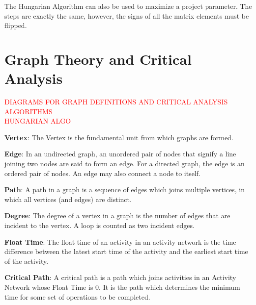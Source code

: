 \begin{note}
	The Hungarian Algorithm can also be used to maximize a project parameter. The steps are exactly the same, however, the signs of all the matrix elements must be flipped.	
\end{note}



\section{Graph Theory and Critical Analysis} \label{Module1:GraphTheoryCriticalAnalysis}

\textcolor{red} {DIAGRAMS FOR GRAPH DEFINITIONS  AND CRITICAL ANALYSIS ALGORITHMS}\\
\textcolor{red}{HUNGARIAN ALGO}
\begin{defn}\label{mod1:defn:Vertex}
   \textbf{Vertex}: The Vertex is the fundamental unit from which graphs are formed.
\end{defn}

\begin{defn}\label{mod1:defn:Edge}
   \textbf{Edge}: In an undirected graph, an unordered pair of nodes that signify  a line joining  two nodes are said to form an edge. For a directed graph, the edge is an ordered pair of nodes. An edge may also connect a node to itself.
\end{defn}

\begin{defn}\label{mod1:defn:Path}
    \textbf{Path}: A path in a graph is a sequence of edges which joins multiple vertices, in which all vertices (and edges) are distinct.
\end{defn}

\begin{defn}\label{mod1:defn:Degree}
   \textbf{Degree}: The degree of a vertex  in a graph is the number of edges that are incident to the vertex. A loop is counted as two incident edges.
\end{defn}

\begin{defn}\label{mod1:defn:FloatTime}
	\textbf{Float Time}: The float time of an activity in an activity network is the time difference between the latest start time of the activity and the earliest start time of the activity.
\end{defn}

\begin{defn}\label{mod1:defn:CritPath}
	\textbf{Critical Path}: A critical path is a path which joins activities in an Activity Network whose Float Time is $0$. It is the path which determines the minimum time for some set of operations to be completed. 
\end{defn}
	
